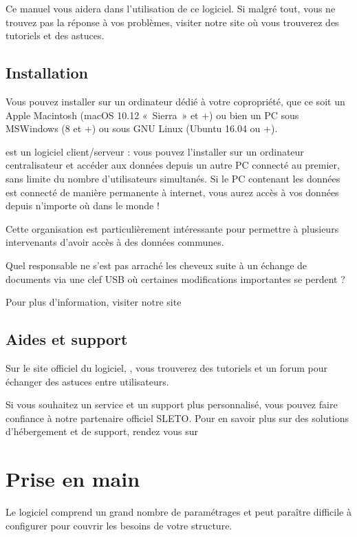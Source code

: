 \documentclass[a4paper,10pt,oneside,french]{sphinxmanual}
\begin{document}
Ce manuel vous aidera dans l’utilisation de ce logiciel.
Si malgré tout, vous ne trouvez pas la réponse à vos problèmes, visiter notre site  où vous trouverez des tutoriels et des astuces.


\subsection{Installation}
\label{\detokenize{syndic/presentation:installation}}
Vous pouvez installer  sur un ordinateur dédié à votre copropriété, que ce soit un Apple Macintosh (macOS 10.12 « Sierra » et +) ou bien un PC sous MS\sphinxhyphen{}Windows (8 et +) ou sous GNU Linux (Ubuntu 16.04 ou +).

 est un logiciel client/serveur : vous pouvez l’installer sur un ordinateur centralisateur et accéder aux données depuis un autre PC connecté au premier, sans limite du nombre d’utilisateurs simultanés.
Si le PC contenant les données est connecté de manière permanente à internet, vous aurez accès à vos données depuis n’importe où dans le monde !

Cette organisation est particulièrement intéressante pour permettre à plusieurs intervenants d’avoir accès à des données communes.

Quel responsable ne s’est pas arraché les cheveux suite à un échange de documents via une clef USB où certaines modifications importantes se perdent ?

Pour plus d’information, visiter notre site 


\subsection{Aides et support}
\label{\detokenize{syndic/presentation:aides-et-support}}
Sur le site officiel du logiciel, , vous trouverez des tutoriels et un forum pour échanger des astuces entre utilisateurs.

Si vous souhaitez un service et un support plus personnalisé, vous pouvez faire confiance à notre partenaire officiel SLETO.
Pour en savoir plus sur des solutions d’hébergement et de support, rendez vous sur 


\section{Prise en main}
\label{\detokenize{syndic/first_step:prise-en-main}}\label{\detokenize{syndic/first_step::doc}}
Le logiciel  comprend un grand nombre de paramétrages et peut paraître difficile à configurer pour couvrir les besoins de votre structure.
\end{document}
